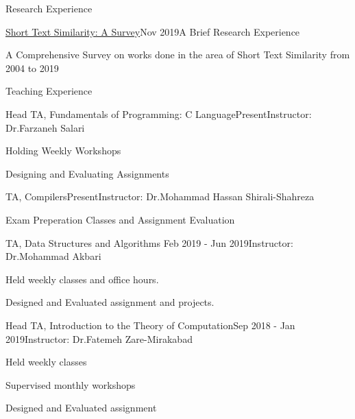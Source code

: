 \documentclass{resume} %
\begin{document}
	\begin{rSection}{Research Experience}
		
			\begin{rSubsection}{\href{https://www.researchgate.net/publication/337632914_Short_Text_Similarity_A_Survey}{Short Text Similarity: A Survey}}{Nov 2019}{A Brief Research Experience}{ }
		\item A Comprehensive Survey on works done in the area of Short Text Similarity from 2004 to 2019
	\end{rSubsection}
	\end{rSection}
	\begin{rSection}{Teaching Experience}
	
		\begin{rSubsection}{Head TA, Fundamentals of Programming: C Language}{Present}{Instructor: Dr.Farzaneh Salari}{ }
		\item Holding Weekly Workshops
		\item Designing and Evaluating Assignments
		
		\end{rSubsection}					%
		\begin{rSubsection}{TA, Compilers}{Present}{Instructor: Dr.Mohammad Hassan Shirali-Shahreza}{ }
		\item Exam Preperation Classes and Assignment Evaluation
		\end{rSubsection}					%
		\begin{rSubsection}{TA, Data Structures and Algorithms }{Feb 2019 - Jun 2019}{Instructor: Dr.Mohammad Akbari}{ }
			\item 
			Held weekly classes and office hours.
			\item 
			Designed and Evaluated assignment and projects.\\
		\end{rSubsection}
		\begin{rSubsection}{Head TA, Introduction to the Theory of Computation}{Sep 2018 - Jan 2019}{Instructor: Dr.Fatemeh Zare-Mirakabad}{ }
			\item Held weekly classes 
			\item Supervised monthly workshops
			\item Designed and Evaluated assignment 		
		\end{rSubsection}
		
	\end{rSection}
\end{document}
